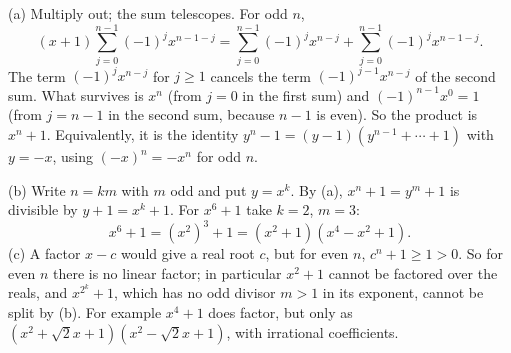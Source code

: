 (a) Multiply out; the sum telescopes. For odd $n$,
\[
(x+1)\sum_{j=0}^{n-1}(-1)^jx^{n-1-j}=\sum_{j=0}^{n-1}(-1)^jx^{n-j}+\sum_{j=0}^{n-1}(-1)^jx^{n-1-j}.
\]
The term $(-1)^jx^{n-j}$ for $j\ge1$ cancels the term $(-1)^{j-1}x^{n-j}$ of the second sum. What survives is $x^n$ (from $j=0$ in the first sum) and $(-1)^{n-1}x^0=1$ (from $j=n-1$ in the second sum, because $n-1$ is even). So the product is $x^n+1$. Equivalently, it is the identity $y^n-1=(y-1)(y^{n-1}+\cdots+1)$ with $y=-x$, using $(-x)^n=-x^n$ for odd $n$.

(b) Write $n=km$ with $m$ odd and put $y=x^k$. By (a), $x^n+1=y^m+1$ is divisible by $y+1=x^k+1$. For $x^6+1$ take $k=2$, $m=3$:
\[
x^6+1=(x^2)^3+1=\left(x^2+1\right)\left(x^4-x^2+1\right).
\]
(c) A factor $x-c$ would give a real root $c$, but for even $n$, $c^n+1\ge1>0$. So for even $n$ there is no linear factor; in particular $x^2+1$ cannot be factored over the reals, and $x^{2^k}+1$, which has no odd divisor $m>1$ in its exponent, cannot be split by (b). For example $x^4+1$ does factor, but only as $\left(x^2+\sqrt2x+1\right)\left(x^2-\sqrt2x+1\right)$, with irrational coefficients.
